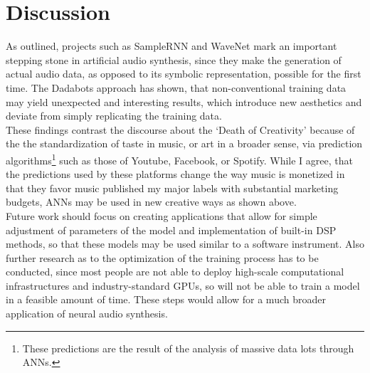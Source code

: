 \documentclass[a4paper, 11pt]{report}
\begin{document}
\chapter{Discussion}
As outlined, projects such as SampleRNN and WaveNet mark an important stepping 
stone in artificial audio synthesis, since they make the generation of actual 
audio data, as opposed to its symbolic representation, possible for the first 
time. The Dadabots approach has shown, that non-conventional training data may 
yield unexpected and interesting results, which introduce new aesthetics and 
deviate from simply replicating the training data. \\
These findings contrast the discourse about the ‘Death of Creativity’ because 
of the the standardization of taste in music, or art in a broader sense, via 
prediction algorithms\footnote{
    These predictions are the result of the analysis of massive data lots 
    through ANNs. 
} such as those of Youtube, Facebook, or Spotify. While I 
agree, that the predictions used by these platforms change the way music is 
monetized in that they favor music published my major labels with substantial 
marketing budgets, ANNs may be used in new creative ways as shown above. \\
Future work should focus on creating applications that allow for simple 
adjustment of parameters of the model and implementation of built-in DSP 
methods, so that these models may be used similar to a software instrument. 
Also further research as to the optimization of the training process has to 
be conducted, since most people are not able to deploy high-scale computational 
infrastructures and industry-standard GPUs, so will not be able to train a 
model in a feasible amount of time. These steps would allow for a much broader 
application of neural audio synthesis.   





\end{document}
